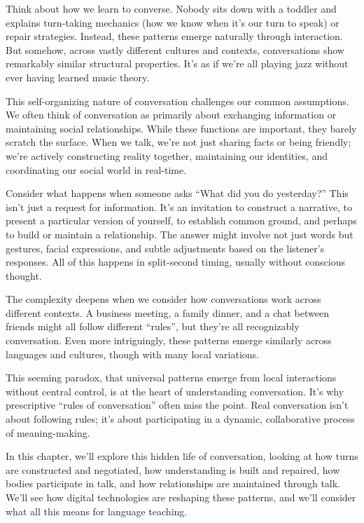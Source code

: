 Think about how we learn to converse. Nobody sits down with a toddler and explains turn-taking mechanics (how we know when it's our turn to speak) or repair strategies. Instead, these patterns emerge naturally through interaction. But somehow, across vastly different cultures and contexts, conversations show remarkably similar structural properties. It's as if we're all playing jazz without ever having learned music theory.

This self-organizing nature of conversation challenges our common assumptions. We often think of conversation as primarily about exchanging information or maintaining social relationships. While these functions are important, they barely scratch the surface. When we talk, we're not just sharing facts or being friendly; we're actively constructing reality together, maintaining our identities, and coordinating our social world in real-time.

Consider what happens when someone asks \enquote{What did you do yesterday?} This isn't just a request for information. It's an invitation to construct a narrative, to present a particular version of yourself, to establish common ground, and perhaps to build or maintain a relationship. The answer might involve not just words but gestures, facial expressions, and subtle adjustments based on the listener's responses. All of this happens in split-second timing, usually without conscious thought.

The complexity deepens when we consider how conversations work across different contexts. A business meeting, a family dinner, and a chat between friends might all follow different \enquote{rules}, but they're all recognizably conversation. Even more intriguingly, these patterns emerge similarly across languages and cultures, though with many local variations.

This seeming paradox, that universal patterns emerge from local interactions without central control, is at the heart of understanding conversation. It's why prescriptive \enquote{rules of conversation} often miss the point. Real conversation isn't about following rules; it's about participating in a dynamic, collaborative process of meaning-making.

In this chapter, we'll explore this hidden life of conversation, looking at how turns are constructed and negotiated, how understanding is built and repaired, how bodies participate in talk, and how relationships are maintained through talk. We'll see how digital technologies are reshaping these patterns, and we'll consider what all this means for language teaching.

